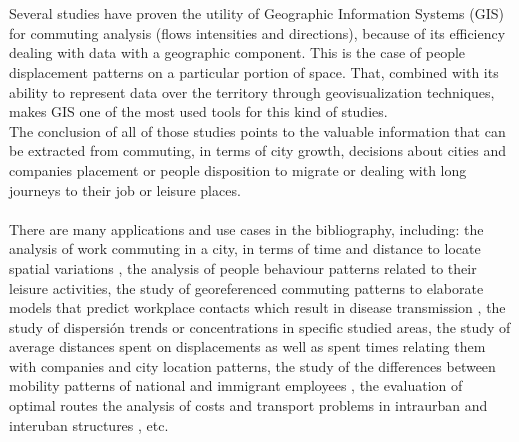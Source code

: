 \\
\\
Several studies have proven the utility of Geographic Information Systems (GIS) for commuting analysis (flows intensities and directions), because of its efficiency dealing with data with a geographic component. This is the case of people displacement patterns on a particular portion of space. That, combined with its ability to represent data over the territory through geovisualization techniques, makes GIS one of the most used tools for this kind of studies. 
\\
The conclusion of all of those studies points to the valuable information that can be extracted from commuting, in terms of city growth, decisions about cities and companies placement or people disposition to migrate or dealing with long journeys to their job or leisure places.
\\
\\
There are many applications and use cases in the bibliography, including: the analysis of work commuting in a city, in terms of time and distance to locate spatial variations \citep{wang2000modeling}, the analysis of people behaviour patterns related to their leisure activities, the study of georeferenced commuting patterns to elaborate models that predict workplace contacts which result in disease transmission \citep{chrest2009using}, the study of dispersión trends or concentrations in specific studied areas, the study of average distances spent on displacements as well as spent times relating them with companies and city location patterns, the study of the differences between mobility patterns of national and immigrant employees \citep{llano2006localizacion}, the evaluation of optimal routes \citep{theriault1999modelling} the analysis of costs and transport problems in intraurban and interuban structures \citep{zhan2008gis}, etc.
